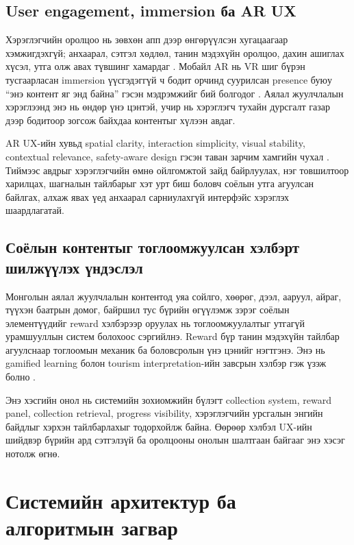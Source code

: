 \begin{sloppy}
\subsection{User engagement, immersion ба AR UX}

Хэрэглэгчийн оролцоо нь зөвхөн апп дээр өнгөрүүлсэн хугацаагаар хэмжигдэхгүй; анхаарал, сэтгэл хөдлөл, танин мэдэхүйн оролцоо, дахин ашиглах хүсэл, утга олж авах түвшинг хамардаг \cite{OBrien2008,Lehmann2012}. Мобайл AR нь VR шиг бүрэн тусгаарласан immersion үүсгэдэггүй ч бодит орчинд суурилсан presence буюу ``энэ контент яг энд байна'' гэсэн мэдрэмжийг бий болгодог \cite{Bowman2007}. Аялал жуулчлалын хэрэглээнд энэ нь өндөр үнэ цэнтэй, учир нь хэрэглэгч тухайн дурсгалт газар дээр бодитоор зогсож байхдаа контентыг хүлээн авдаг.

AR UX-ийн хувьд spatial clarity, interaction simplicity, visual stability, contextual relevance, safety-aware design гэсэн таван зарчим хамгийн чухал \cite{Yovcheva2014AugmentedTourism}. Тиймээс авдрыг хэрэглэгчийн өмнө ойлгомжтой зайд байрлуулах, нэг товшилтоор харилцах, шагналын тайлбарыг хэт урт биш боловч соёлын утга агуулсан байлгах, алхаж явах үед анхаарал сарниулахгүй интерфэйс хэрэглэх шаардлагатай.

\subsection{Соёлын контентыг тоглоомжуулсан хэлбэрт шилжүүлэх үндэслэл}

Монголын аялал жуулчлалын контентод уяа сойлго, хөөрөг, дээл, ааруул, айраг, түүхэн баатрын домог, байршил тус бүрийн өгүүлэмж зэрэг соёлын элементүүдийг reward хэлбэрээр оруулах нь тоглоомжуулалтыг утгагүй урамшууллын систем болохоос сэргийлнэ. Reward бүр танин мэдэхүйн тайлбар агуулснаар тоглоомын механик ба боловсролын үнэ цэнийг нэгтгэнэ. Энэ нь gamified learning болон tourism interpretation-ийн завсрын хэлбэр гэж үзэж болно \cite{Xu2017GamificationTourism,Jo2025ARGamification}.

Энэ хэсгийн онол нь системийн зохиомжийн бүлэгт collection system, reward panel, collection retrieval, progress visibility, хэрэглэгчийн урсгалын энгийн байдлыг хэрхэн тайлбарлахыг тодорхойлж байна. Өөрөөр хэлбэл UX-ийн шийдвэр бүрийн ард сэтгэлзүй ба оролцооны онолын шалтгаан байгааг энэ хэсэг нотолж өгнө.

\section{Системийн архитектур ба алгоритмын загвар}


\end{sloppy}
